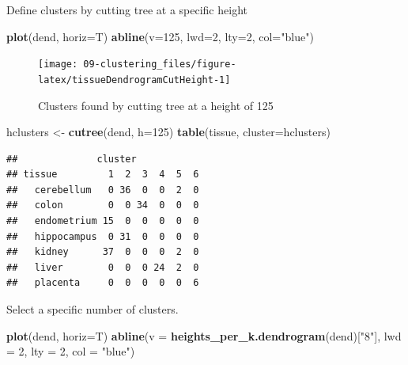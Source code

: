 \documentclass[]{book}
\newenvironment{Shaded}{\begin{snugshade}}{\end{snugshade}}
\newcommand{\KeywordTok}[1]{\textcolor[rgb]{0.13,0.29,0.53}{\textbf{{#1}}}}
\newcommand{\DataTypeTok}[1]{\textcolor[rgb]{0.13,0.29,0.53}{{#1}}}
\newcommand{\DecValTok}[1]{\textcolor[rgb]{0.00,0.00,0.81}{{#1}}}
\newcommand{\StringTok}[1]{\textcolor[rgb]{0.31,0.60,0.02}{{#1}}}
\newcommand{\NormalTok}[1]{{#1}}
\theoremstyle{definition}
\theoremstyle{definition}
\theoremstyle{definition}
\theoremstyle{remark}
\begin{document}
Define clusters by cutting tree at a specific height

\begin{Shaded}
\begin{Highlighting}[]
\KeywordTok{plot}\NormalTok{(dend, }\DataTypeTok{horiz=}\NormalTok{T)}
\KeywordTok{abline}\NormalTok{(}\DataTypeTok{v=}\DecValTok{125}\NormalTok{, }\DataTypeTok{lwd=}\DecValTok{2}\NormalTok{, }\DataTypeTok{lty=}\DecValTok{2}\NormalTok{, }\DataTypeTok{col=}\StringTok{"blue"}\NormalTok{)}
\end{Highlighting}
\end{Shaded}

\begin{figure}

{\centering \texttt{[image: 09-clustering\_files/figure-latex/tissueDendrogramCutHeight-1]} 

}

\caption{Clusters found by cutting tree at a height of 125}\label{fig:tissueDendrogramCutHeight}
\end{figure}

\begin{Shaded}
\begin{Highlighting}[]
\NormalTok{hclusters <-}\StringTok{ }\KeywordTok{cutree}\NormalTok{(dend, }\DataTypeTok{h=}\DecValTok{125}\NormalTok{)}
\KeywordTok{table}\NormalTok{(tissue, }\DataTypeTok{cluster=}\NormalTok{hclusters)}
\end{Highlighting}
\end{Shaded}

\begin{verbatim}
##              cluster
## tissue         1  2  3  4  5  6
##   cerebellum   0 36  0  0  2  0
##   colon        0  0 34  0  0  0
##   endometrium 15  0  0  0  0  0
##   hippocampus  0 31  0  0  0  0
##   kidney      37  0  0  0  2  0
##   liver        0  0  0 24  2  0
##   placenta     0  0  0  0  0  6
\end{verbatim}

Select a specific number of clusters.

\begin{Shaded}
\begin{Highlighting}[]
\KeywordTok{plot}\NormalTok{(dend, }\DataTypeTok{horiz=}\NormalTok{T)}
\KeywordTok{abline}\NormalTok{(}\DataTypeTok{v =} \KeywordTok{heights_per_k.dendrogram}\NormalTok{(dend)[}\StringTok{"8"}\NormalTok{], }\DataTypeTok{lwd =} \DecValTok{2}\NormalTok{, }\DataTypeTok{lty =} \DecValTok{2}\NormalTok{, }\DataTypeTok{col =} \StringTok{"blue"}\NormalTok{)}
\end{Highlighting}
\end{Shaded}
\end{document}
